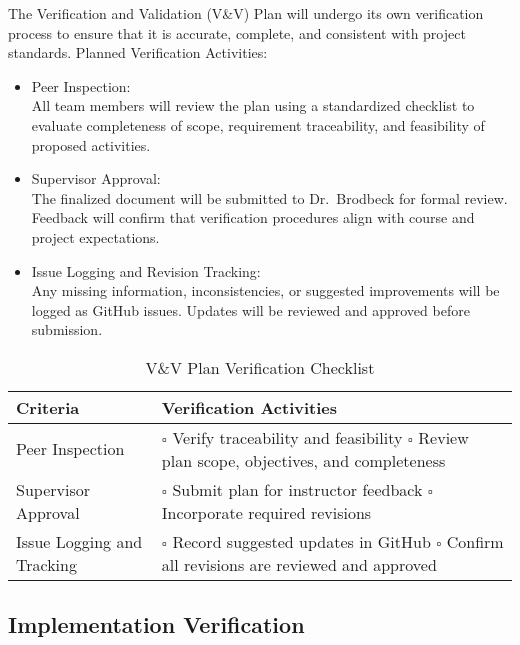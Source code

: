 \documentclass[12pt, titlepage]{article}
\begin{document}
The Verification and Validation (V\&V) Plan will undergo its own verification process to ensure that it is accurate, complete, and consistent with project standards. Planned Verification Activities:

\begin{itemize}
    \item Peer Inspection: \\
    All team members will review the plan using a standardized checklist to evaluate completeness of scope, requirement traceability, and feasibility of proposed activities.

    \item Supervisor Approval: \\
    The finalized document will be submitted to Dr.~Brodbeck for formal review. Feedback will confirm that verification procedures align with course and project expectations.

    \item Issue Logging and Revision Tracking: \\
    Any missing information, inconsistencies, or suggested improvements will be logged as GitHub issues. Updates will be reviewed and approved before submission.
\end{itemize}

\begin{table}[H]
\centering
\caption{V\&V Plan Verification Checklist}
\renewcommand{\arraystretch}{1.3}
\begin{tabular}{|p{5.5cm}|p{8cm}|}
\hline
Criteria & Verification Activities \\ \hline
Peer Inspection &
\(\square\) Verify traceability and feasibility  \newline
\(\square\) Review plan scope, objectives, and completeness \\ \hline
Supervisor Approval &
\(\square\) Submit plan for instructor feedback \newline
\(\square\) Incorporate required revisions \\ \hline
Issue Logging and Tracking &
\(\square\) Record suggested updates in GitHub \newline
\(\square\) Confirm all revisions are reviewed and approved \\ \hline
\end{tabular}
\end{table}

\subsection{Implementation Verification}
\end{document}
